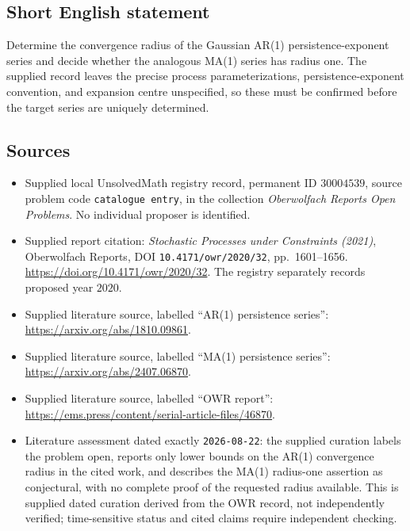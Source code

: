 \documentclass[11pt]{article}
\begin{document}
\subsection{Short English statement}
Determine the convergence radius of the Gaussian AR(1) persistence-exponent series and decide whether the analogous MA(1) series has radius one. The supplied record leaves the precise process parameterizations, persistence-exponent convention, and expansion centre unspecified, so these must be confirmed before the target series are uniquely determined.
\subsection{Sources}
\begin{itemize}
\item Supplied local UnsolvedMath registry record, permanent ID \(30004539\), source problem code \texttt{catalogue entry}, in the collection \emph{Oberwolfach Reports Open Problems}. No individual proposer is identified.
\item Supplied report citation: \emph{Stochastic Processes under Constraints (2021)}, Oberwolfach Reports, DOI \texttt{10.4171/owr/2020/32}, pp.\ 1601--1656. \url{https://doi.org/10.4171/owr/2020/32}. The registry separately records proposed year \(2020\).
\item Supplied literature source, labelled ``AR(1) persistence series'': \url{https://arxiv.org/abs/1810.09861}.
\item Supplied literature source, labelled ``MA(1) persistence series'': \url{https://arxiv.org/abs/2407.06870}.
\item Supplied literature source, labelled ``OWR report'': \url{https://ems.press/content/serial-article-files/46870}.
\item Literature assessment dated exactly \texttt{2026-08-22}: the supplied curation labels the problem open, reports only lower bounds on the AR(1) convergence radius in the cited work, and describes the MA(1) radius-one assertion as conjectural, with no complete proof of the requested radius available. This is supplied dated curation derived from the OWR record, not independently verified; time-sensitive status and cited claims require independent checking.
\end{itemize}
\end{document}

